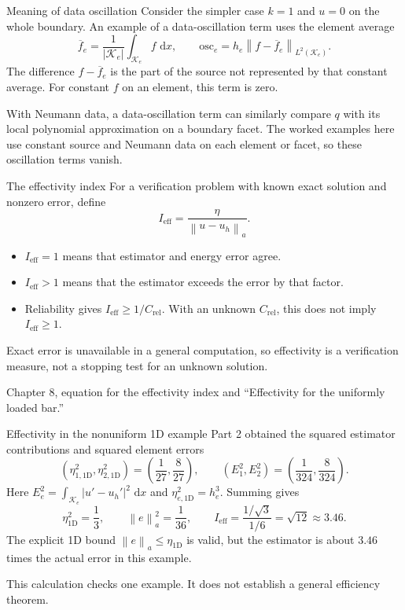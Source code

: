 \documentclass[11pt,aspectratio=169]{beamer}
\newcommand{\dd}{\,\mathrm{d}}
\newcommand{\norm}[2][]{\left\lVert#2\right\rVert_{#1}}
\begin{document}
\begin{frame}{Meaning of data oscillation}
Consider the simpler case $k=1$ and $u=0$ on the whole boundary.
An example of a data-oscillation term uses the element average
\[
 \overline f_e=\frac{1}{|\mathcal K_e|}\int_{\mathcal K_e}f\,\dd x,
 \qquad
 \mathrm{osc}_e=h_e\norm[L^2(\mathcal K_e)]{f-\overline f_e}.
\]
The difference $f-\overline f_e$ is the part of the source not represented
by that constant average. For constant $f$ on an element, this term is zero.

With Neumann data, a data-oscillation term can similarly compare $q$ with
its local polynomial approximation on a boundary facet.
The worked examples here use constant source and Neumann data on each
element or facet, so these oscillation terms vanish.
\end{frame}

\begin{frame}{The effectivity index}
For a verification problem with known exact solution and nonzero error, define
\[
 \boxed{I_{\mathrm{eff}}=\frac{\eta}{\norm[a]{u-u_h}}.}
\]
\begin{itemize}
 \item $I_{\mathrm{eff}}=1$ means that estimator and energy error agree.
 \item $I_{\mathrm{eff}}>1$ means that the estimator exceeds the error by that factor.
 \item Reliability gives $I_{\mathrm{eff}}\geq1/C_{\mathrm{rel}}$.
 With an unknown $C_{\mathrm{rel}}$, this does not imply $I_{\mathrm{eff}}\geq1$.
\end{itemize}
Exact error is unavailable in a general computation, so effectivity is a
verification measure, not a stopping test for an unknown solution.

\vspace{0.15cm}
{\footnotesize Chapter 8, equation for the effectivity index and
``Effectivity for the uniformly loaded bar.''}
\end{frame}

\begin{frame}{Effectivity in the nonuniform 1D example}
Part 2 obtained the squared estimator contributions and squared element errors
\[
 \left(\eta_{1,\mathrm{1D}}^2,\eta_{2,\mathrm{1D}}^2\right)
 =\left(\frac1{27},\frac8{27}\right),\qquad
 \left(E_1^2,E_2^2\right)=\left(\frac1{324},\frac8{324}\right).
\]
Here $E_e^2=\int_{\mathcal K_e}|u'-u_h'|^2\,\dd x$ and
$\eta_{e,\mathrm{1D}}^2=h_e^3$. Summing gives
\[
 \eta_{\mathrm{1D}}^2=\frac13,\qquad
 \norm[a]{e}^2=\frac1{36},\qquad
 I_{\mathrm{eff}}=\frac{1/\sqrt3}{1/6}=\sqrt{12}\approx3.46.
\]
The explicit 1D bound $\norm[a]{e}\leq\eta_{\mathrm{1D}}$ is valid, but
the estimator is about $3.46$ times the actual error in this example.

This calculation checks one example. It does not establish a general
efficiency theorem.
\end{frame}
\end{document}
